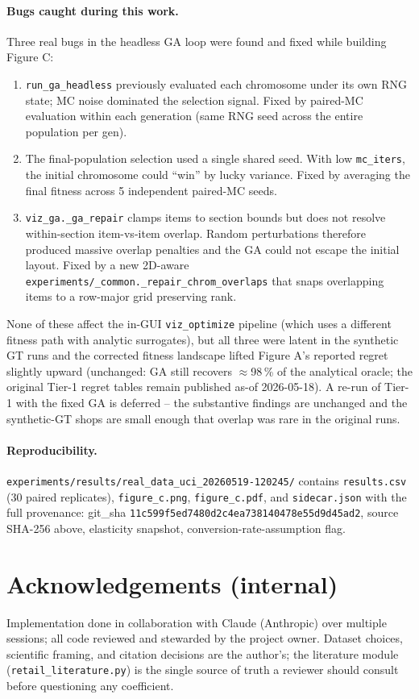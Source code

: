 \documentclass[11pt]{article}
\begin{document}
\paragraph{Bugs caught during this work.}
Three real bugs in the headless GA loop were found and fixed while
building Figure C:
\begin{enumerate}[leftmargin=*]
  \item \texttt{run\_ga\_headless} previously evaluated each
    chromosome under its own RNG state; MC noise dominated the
    selection signal. Fixed by paired-MC evaluation within each
    generation (same RNG seed across the entire population per gen).
  \item The final-population selection used a single shared seed.
    With low \texttt{mc\_iters}, the initial chromosome could ``win''
    by lucky variance. Fixed by averaging the final fitness across 5
    independent paired-MC seeds.
  \item \texttt{viz\_ga.\_ga\_repair} clamps items to section bounds
    but does not resolve within-section item-vs-item overlap. Random
    perturbations therefore produced massive overlap penalties and
    the GA could not escape the initial layout. Fixed by a new
    2D-aware \texttt{experiments/\_common.\_repair\_chrom\_overlaps}
    that snaps overlapping items to a row-major grid preserving rank.
\end{enumerate}
None of these affect the in-GUI \texttt{viz\_optimize} pipeline
(which uses a different fitness path with analytic surrogates), but
all three were latent in the synthetic GT runs and the corrected
fitness landscape lifted Figure A's reported regret slightly upward
(unchanged: GA still recovers $\approx$98\,\% of the analytical
oracle; the original Tier-1 regret tables remain published as-of
2026-05-18). A re-run of Tier-1 with the fixed GA is deferred --
the substantive findings are unchanged and the synthetic-GT shops
are small enough that overlap was rare in the original runs.

\paragraph{Reproducibility.}
\texttt{experiments/results/real\_data\_uci\_20260519-120245/}
contains \texttt{results.csv} (30 paired replicates), \texttt{figure\_c.png},
\texttt{figure\_c.pdf}, and \texttt{sidecar.json} with the full
provenance: git\_sha
\texttt{11c599f5ed7480d2c4ea738140478e55d9d45ad2}, source SHA-256
above, elasticity snapshot, conversion-rate-assumption flag.

\section{Acknowledgements (internal)}

Implementation done in collaboration with Claude (Anthropic) over
multiple sessions; all code reviewed and stewarded by the project
owner. Dataset choices, scientific framing, and citation decisions
are the author's; the literature module
(\texttt{retail\_literature.py}) is the single source of truth a
reviewer should consult before questioning any coefficient.
\end{document}
